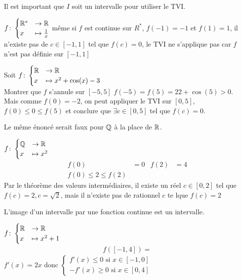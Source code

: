 \begin{remarque}
Il est important que $I$ soit un intervalle pour utiliser le TVI.
\end{remarque}
\begin{exemple}
$
f \colon 
\begin{cases}
\mathbb{R}^* &\to \mathbb{R} \\
x &\mapsto \frac{1}{x}
\end{cases}
$
même si $f$ est continue sur $R^*$, $f(-1) = -1$ et $f(1) = 1$, il n'existe pas de $c \in [-1, 1]$ tel que $f(c) = 0$, le TVI ne s'applique pas car $f$ n'est pas définie sur $[-1, 1]$
\end{exemple}

\begin{exemple}
Soit 
$
f \colon 
\begin{cases}
\mathbb{R} &\to \mathbb{R} \\
x &\mapsto x^2 + \cos(x) -3
\end{cases}
$ 
\\
Montrer que $f$ s'annule sur $[-5, 5]$ $f(-5) = f(5) = 22 + \cos(5) > 0 $. \\
Mais comme $f(0) = -2$, on peut appliquer le TVI sur $[0, 5]$, $f(0) \leq 0 \leq f(5)$ et conclure que $\exists c \in [0, 5]$ tel que $f(c) = 0$.
\end{exemple}

\begin{remarque}
Le même énoncé serait faux pour $\mathbb{Q}$ à la place de $\mathbb{R}$. 
\end{remarque}

\begin{exemple}
$
f \colon 
\begin{cases}
\mathbb{Q} &\to \mathbb{R} \\
x &\mapsto x^2
\end{cases}
$
\begin{align*}
f(0) &= 0 & f(2) &= 4 \\
f(0) \leq 2 \leq f(2)
\end{align*}
Par le théorème des valeurs intermédiaires, il existe un réel $c \in [0, 2]$ tel que $f(c) = 2, c = \sqrt{2}$, mais il n'existe pas de rationnel $c$ te lque $f(c) = 2$
\end{exemple}

\begin{remarque}
L'image d'un intervalle par une fonction continue est un intervalle.
\end{remarque}

\begin{exemple}
$
f \colon
\begin{cases}
\mathbb{R} &\to \mathbb{R} \\
x &\mapsto x^2 + 1
\end{cases}
$
\begin{align*}
f([-1, 4]) =
\end{align*}
$f'(x) = 2x$ donc 
$
\begin{cases}
f'(x) \leq 0 \text{ si } x \in [-1, 0] \\
-f'(x) \geq 0 \text{ si } x \in [0, 4]
\end{cases}
$
\end{exemple}

